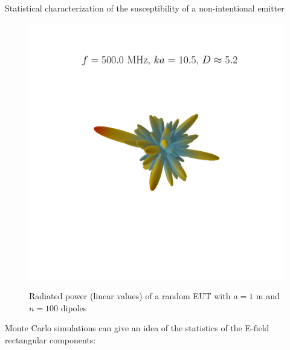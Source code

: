 \documentclass[final,hyperref={pdfpagelabels=false}]{beamer}
\begin{document}
\begin{frame}{}
\begin{columns}[t]
\begin{column}{0.32\linewidth}
\begin{block}{{Statistical characterization of the susceptibility of a non-intentional emitter}}
\begin{figure}
{          \includegraphics[trim=110 180 90 180,clip,width=0.48\columnwidth]{./img/rp_124.png}} 
\vspace{-0.3cm}
    \large{\caption{Radiated power (linear values) of a random EUT with  $a=1$ m and $n=100$ dipoles}}
     \label{fig_diagsr}
\end{figure}
Monte Carlo simulations can give an idea of the statistics of the E-field rectangular components:
\vspace{0.3cm}
\begin{figure}
     \centering

\end{figure}
\end{block}
\end{column}
\end{columns}
\end{frame}
\end{document}
